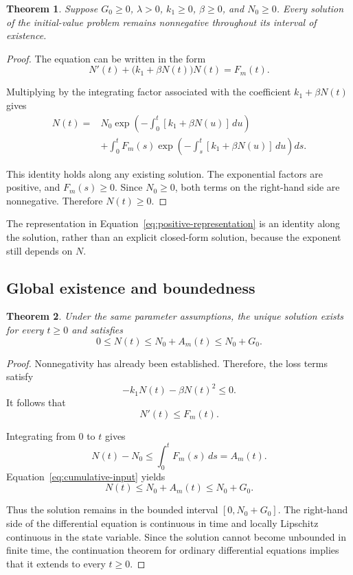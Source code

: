 \documentclass[12pt]{article}
\newtheorem{theorem}{Theorem}[section]
\theoremstyle{definition}
\theoremstyle{remark}
\begin{document}
\begin{theorem}
Suppose \(G_0\geq 0\), \(\lambda>0\), \(k_1\geq 0\),
\(\beta\geq 0\), and \(N_0\geq 0\). Every solution of
the initial-value problem remains nonnegative throughout
its interval of existence.
\end{theorem}

\begin{proof}
The equation can be written in the form
\[
N'(t)+\bigl(k_1+\beta N(t)\bigr)N(t)=F_m(t).
\]

Multiplying by the integrating factor associated with
the coefficient \(k_1+\beta N(t)\) gives
\begin{align}
N(t)
={}&N_0
\exp\left(
-\int_0^t[k_1+\beta N(u)]\,du
\right)
\nonumber\\
&+
\int_0^t F_m(s)
\exp\left(
-\int_s^t[k_1+\beta N(u)]\,du
\right)ds.
\label{eq:positive-representation}
\end{align}

This identity holds along any existing solution. The
exponential factors are positive, and \(F_m(s)\geq 0\).
Since \(N_0\geq 0\), both terms on the right-hand side
are nonnegative. Therefore \(N(t)\geq 0\).
\end{proof}

The representation in Equation~\eqref{eq:positive-representation}
is an identity along the solution, rather than an explicit
closed-form solution, because the exponent still depends
on \(N\).

\subsection{Global existence and boundedness}

\begin{theorem}
Under the same parameter assumptions, the unique solution
exists for every \(t\geq 0\) and satisfies
\begin{equation}
0\leq N(t)\leq N_0+A_m(t)\leq N_0+G_0.
\label{eq:global-bound}
\end{equation}
\end{theorem}

\begin{proof}
Nonnegativity has already been established. Therefore,
the loss terms satisfy
\[
-k_1N(t)-\beta N(t)^2\leq 0.
\]
It follows that
\[
N'(t)\leq F_m(t).
\]

Integrating from \(0\) to \(t\) gives
\[
N(t)-N_0\leq\int_0^t F_m(s)\,ds=A_m(t).
\]
Equation~\eqref{eq:cumulative-input} yields
\[
N(t)\leq N_0+A_m(t)\leq N_0+G_0.
\]

Thus the solution remains in the bounded interval
\([0,N_0+G_0]\). The right-hand side of the differential
equation is continuous in time and locally Lipschitz
continuous in the state variable. Since the solution
cannot become unbounded in finite time, the continuation
theorem for ordinary differential equations implies
that it extends to every \(t\geq 0\).
\end{proof}
\end{document}
